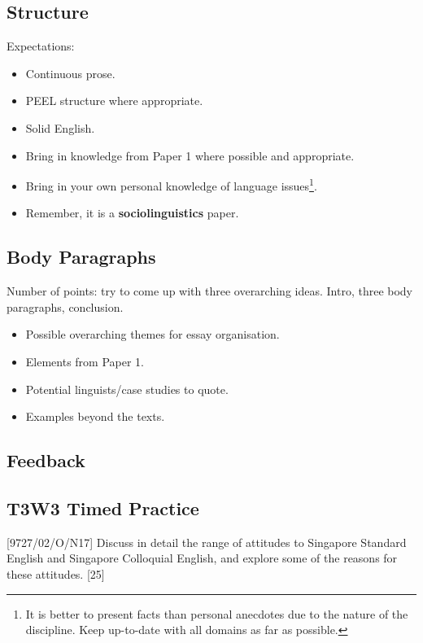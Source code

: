 \documentclass[../main.tex]{subfiles}
\begin{document}
    \subsection{Structure}
    Expectations:
    \begin{itemize}
        \item Continuous prose.
        \item PEEL structure where appropriate.
        \item Solid English.
        \item Bring in knowledge from Paper 1 where possible and appropriate.
        \item Bring in your own personal knowledge of language issues\footnote{It is better to present facts than personal anecdotes due to the nature of the discipline. Keep up-to-date with all domains as far as possible.}.
        \item Remember, it is a \textbf{sociolinguistics} paper.
    \end{itemize}
    
    \subsection{Body Paragraphs}
        Number of points: try to come up with three overarching ideas. Intro, three body paragraphs, conclusion. 
        \begin{itemize}
            \item Possible overarching themes for essay organisation.
            \item Elements from Paper 1.
            \item Potential linguists/case studies to quote.
            \item Examples beyond the texts.
        \end{itemize}

    \subsection{Feedback}
        \subsection*{T3W3 Timed Practice}
        [9727/02/O/N17] Discuss in detail the range of attitudes to Singapore Standard English and Singapore Colloquial English, and explore some of the reasons for these attitudes. \hfill [25]
\end{document}
